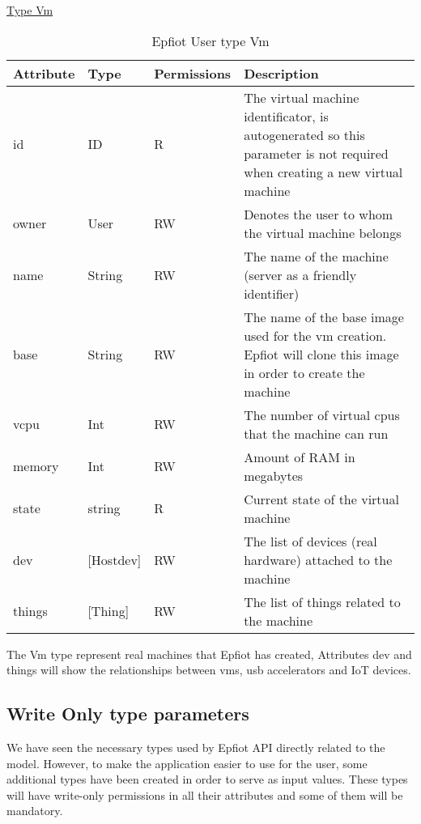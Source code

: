 \underline{Type Vm}
\begin{table}[H]
    \begin{center}
    \begin{tabular}[b]{|l|l|l|p{11cm}|}
        \hline
        Attribute & Type & Permissions & Description \\
        \hline
        id & ID & R & The virtual machine identificator, is autogenerated so this parameter is not required when creating a new virtual machine\\
        \hline
        owner & User & RW & Denotes the user to whom the virtual machine belongs\\
        \hline
        name & String & RW & The name of the machine (server as a friendly identifier)\\
        \hline
        base & String & RW & The name of the base image used for the vm creation. Epfiot will clone this image in order to create the machine\\
        \hline
        vcpu & Int & RW &  The number of virtual cpus that the machine can run\\
        \hline
        memory & Int & RW & Amount of RAM in megabytes\\
        \hline
        state & string & R & Current state of the virtual machine\\
        \hline
        dev & [Hostdev] & RW & The list of devices (real hardware) attached to the machine\\
        \hline
        things & [Thing] & RW & The list of things related to the machine \\
        \hline
    \end{tabular}
    \caption{Epfiot User type Vm}
    \label{table1}
   \end{center}
\end{table}

The Vm type represent real machines that Epfiot has created, Attributes dev and things will show the relationships between vms, usb accelerators and IoT devices.

\subsection{Write Only type parameters}

We have seen the necessary types used by Epfiot API directly related to the model. However, to make the application easier to use for the user, some additional types have been created in order to serve as input values. These types will have write-only permissions in all their attributes and some of them will be mandatory.

